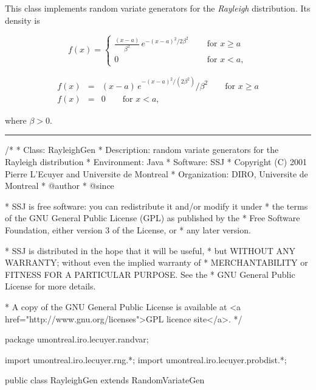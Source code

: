
This class implements random variate generators for the
{\em Rayleigh\/} distribution.
 Its density is
\begin{latexonly}
\[
 f(x) = \left\{
\begin{array}{ll}
   \frac{(x-a)}{\beta^2}\, e^{-(x-a)^2/2\beta^2} \quad
 &  \mbox{ for } x \ge  a \\[6pt]
    0  & \mbox{ for } x < a,
\end{array}
   \right.
\]
\end{latexonly}
\begin{htmlonly}
\begin{eqnarray*}
  f(x) &=& {(x-a)}\, e^{-(x-a)^2/(2\beta^2)} / {\beta^2}
 \qquad\mbox{for } x \ge a \\[8pt]
   f(x) &=& 0  \qquad\mbox{for } x < a,
\end{eqnarray*}
\end{htmlonly}
where $\beta > 0$.


\bigskip\hrule

\begin{code}
\begin{hide}
/*
 * Class:        RayleighGen
 * Description:  random variate generators for the Rayleigh distribution
 * Environment:  Java
 * Software:     SSJ 
 * Copyright (C) 2001  Pierre L'Ecuyer and Universite de Montreal
 * Organization: DIRO, Universite de Montreal
 * @author       
 * @since

 * SSJ is free software: you can redistribute it and/or modify it under
 * the terms of the GNU General Public License (GPL) as published by the
 * Free Software Foundation, either version 3 of the License, or
 * any later version.

 * SSJ is distributed in the hope that it will be useful,
 * but WITHOUT ANY WARRANTY; without even the implied warranty of
 * MERCHANTABILITY or FITNESS FOR A PARTICULAR PURPOSE.  See the
 * GNU General Public License for more details.

 * A copy of the GNU General Public License is available at
   <a href="http://www.gnu.org/licenses">GPL licence site</a>.
 */
\end{hide}
package umontreal.iro.lecuyer.randvar;\begin{hide}
import umontreal.iro.lecuyer.rng.*;
import umontreal.iro.lecuyer.probdist.*;
\end{hide}

public class RayleighGen extends RandomVariateGen \begin{hide} {
   private double a;
   private double beta;
\end{hide}\end{code}

